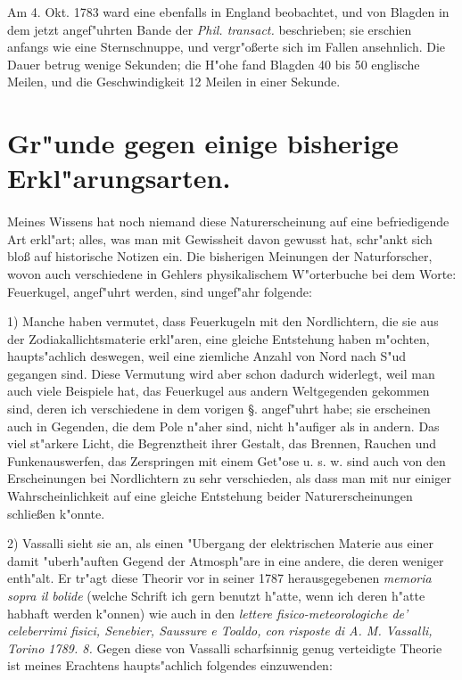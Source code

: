 \documentclass[a4paper, 11pt, oneside, polutonikogreek, german]{article}
\begin{document}
Am 4. Okt. 1783 ward eine ebenfalls in England beobachtet, und von Blagden in dem jetzt angef"uhrten Bande der \emph{Phil. transact.} beschrieben; sie erschien anfangs wie eine Sternschnuppe, und vergr"oßerte sich im Fallen ansehnlich. Die Dauer betrug wenige Sekunden; die H"ohe fand Blagden 40 bis 50 englische Meilen, und die Geschwindigkeit 12 Meilen in einer Sekunde.
\clearpage
\section{Gr"unde gegen einige bisherige Erkl"arungsarten.}
\paragraph{}
Meines Wissens hat noch niemand diese Naturerscheinung auf eine befriedigende Art erkl"art; alles, was man mit Gewissheit davon gewusst hat, schr"ankt sich bloß auf historische Notizen ein. Die bisherigen Meinungen der Naturforscher, wovon auch verschiedene in Gehlers physikalischem W"orterbuche bei dem Worte: Feuerkugel, angef"uhrt werden, sind ungef"ahr folgende:

1) Manche haben vermutet, dass Feuerkugeln mit den Nordlichtern, die sie aus der Zodiakallichtsmaterie erkl"aren, eine gleiche Entstehung haben m"ochten, haupts"achlich deswegen, weil eine ziemliche Anzahl von Nord nach S"ud gegangen sind. Diese Vermutung wird aber schon dadurch widerlegt, weil man auch viele Beispiele hat, das Feuerkugel aus andern Weltgegenden gekommen sind, deren ich verschiedene in dem vorigen §. angef"uhrt habe; sie erscheinen auch in Gegenden, die dem Pole n"aher sind, nicht h"aufiger als in andern. Das viel st"arkere Licht, die Begrenztheit ihrer Gestalt, das Brennen, Rauchen und Funkenauswerfen, das Zerspringen mit einem Get"ose u. s. w. sind auch von den Erscheinungen bei Nordlichtern zu sehr verschieden, als dass man mit nur einiger Wahrscheinlichkeit auf eine gleiche Entstehung beider Naturerscheinungen schließen k"onnte.

2) Vassalli sieht sie an, als einen "Ubergang der elektrischen Materie aus einer damit "uberh"auften Gegend der Atmosph"are in eine andere, die deren weniger enth"alt. Er tr"agt diese Theorir vor in seiner 1787 herausgegebenen \emph{memoria sopra il bolide} (welche Schrift ich gern benutzt h"atte, wenn ich deren h"atte habhaft werden k"onnen) wie auch in den \emph{lettere fisico-meteorologiche de' celeberrimi fisici, Senebier, Saussure e Toaldo, con risposte di A. M. Vassalli, Torino 1789. 8.} Gegen diese von Vassalli scharfsinnig genug verteidigte Theorie ist meines Erachtens haupts"achlich folgendes einzuwenden:
\end{document}
